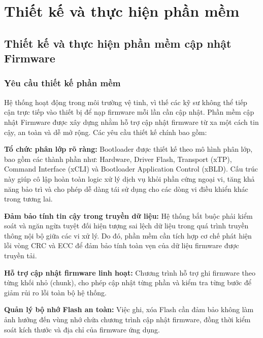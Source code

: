 
\chapter{Thiết kế và thực hiện phần mềm}
\label{ch:thiet_ke_phan_mem}


\section{Thiết kế và thực hiện phần mềm cập nhật Firmware}
\label{sec:thiet_ke_va_thuc_hien_Bootloader}

\subsection{Yêu cầu thiết kế phần mềm}
\label{sec:yeu_cau_thiet_ke_phan_mem}

Hệ thống hoạt động trong môi trường vệ tinh, vì thế các kỹ sư không thể tiếp cận trực tiếp vào thiết bị để nạp firmware mỗi lần cần cập nhật. Phần mềm cập nhật Firmware được xây dựng nhằm hỗ trợ cập nhật firmware từ xa một cách tin cậy, an toàn và dễ mở rộng. Các yêu cầu thiết kế chính bao gồm:

\textbf{Tổ chức phân lớp rõ ràng:} 
Bootloader được thiết kế theo mô hình phân lớp, bao gồm các thành phần như: Hardware, Driver Flash, Transport (xTP), Command Interface (xCLI) và Bootloader Application Control (xBLD). Cấu trúc này giúp cô lập hoàn toàn logic xử lý dịch vụ khỏi phần cứng ngoại vi, tăng khả năng bảo trì và cho phép dễ dàng tái sử dụng cho các dòng vi điều khiển khác trong tương lai.

\textbf{Đảm bảo tính tin cậy trong truyền dữ liệu:}
Hệ thống bắt buộc phải kiểm soát và ngăn ngừa tuyệt đối hiện tượng sai lệch dữ liệu trong quá trình truyền thông nội bộ giữa các vi xử lý. Do đó, phần mềm cần tích hợp cơ chế phát hiện lỗi vòng CRC và ECC để đảm bảo tính toàn vẹn của dữ liệu firmware được truyền tải.

\textbf{Hỗ trợ cập nhật firmware linh hoạt:}
Chương trình hỗ trợ ghi firmware theo từng khối nhỏ (chunk), cho phép cập nhật từng phần và kiểm tra từng bước để giảm rủi ro lỗi toàn bộ hệ thống. 

\textbf{Quản lý bộ nhớ Flash an toàn:}
Việc ghi, xóa Flash cần đảm bảo không làm ảnh hưởng đến vùng nhớ chứa chương trình cập nhật firmware, đồng thời kiểm soát kích thước và địa chỉ của firmware ứng dụng. 


